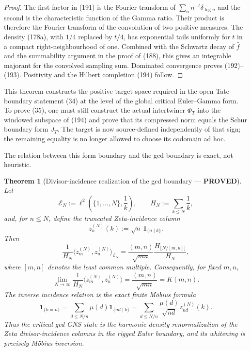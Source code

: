 \documentclass[11pt]{article}
\newtheorem{theorem}{Theorem}
\newcommand{\PROVED}{\textcolor{green!45!black}{\textbf{PROVED}}}
\begin{document}
\begin{proof}
The first factor in (191) is the Fourier transform of
$\sum_n n^{-t}\delta_{\log n}$ and the second is the characteristic function
of the Gamma ratio.  Their product is therefore the Fourier transform of the
convolution of two positive measures.  The density (178a), with $1/4$
replaced by $t/4$, has exponential tails uniformly for $t$ in a compact
right-neighbourhood of one.  Combined with the Schwartz decay of
$\widehat f$ and the summability argument in the proof of (188), this gives
an integrable majorant for the convolved sampling sum.  Dominated convergence
proves (192)--(193).  Positivity and the Hilbert completion (194) follow.
\end{proof}

This theorem constructs the positive target space required in the open
Tate-boundary statement (34) at the level of the global critical
Euler--Gamma form.  To prove (35), one must still construct the actual
intertwiner $\Phi_T$ into the windowed subspace of (194) and prove that its
compressed norm equals the Schur boundary form $J_T$.  The target is now
source-defined independently of that sign; the remaining equality is no
longer allowed to choose its codomain ad hoc.

The relation between this form boundary and the gcd boundary is exact, not
heuristic.

\begin{theorem}[Divisor-incidence realization of the gcd boundary --- \PROVED]
Let
\begin{equation}
 \mathscr E_N:=\ell^2\left(\{1,\ldots,N\},\frac1k\right),
 \qquad H_N:=\sum_{k\le N}\frac1k,
\end{equation}
and, for $n\le N$, define the truncated Zeta-incidence column
\begin{equation}
 z_n^{(N)}(k):=\sqrt n\,\mathbf1_{\{n\mid k\}}.
                                                               \tag{195}
\end{equation}
Then
\begin{equation}
 \frac1{H_N}\langle z_m^{(N)},z_n^{(N)}\rangle_{\mathscr E_N}
 =\frac{(m,n)}{\sqrt{mn}}
   \frac{H_{\lfloor N/[m,n]\rfloor}}{H_N},           \tag{196}
\end{equation}
where $[m,n]$ denotes the least common multiple.  Consequently, for fixed
$m,n$,
\begin{equation}
 \lim_{N\to\infty}\frac1{H_N}
 \langle z_m^{(N)},z_n^{(N)}\rangle
 =\frac{(m,n)}{\sqrt{mn}}=K(m,n).                    \tag{197}
\end{equation}
The inverse incidence relation is the exact finite M\"obius formula
\begin{equation}
 \mathbf1_{\{k=n\}}
 =\sum_{d\le N/n}\mu(d)\mathbf1_{\{nd\mid k\}}
 =\sum_{d\le N/n}\frac{\mu(d)}{\sqrt{nd}}
       z_{nd}^{(N)}(k).                               \tag{198}
\end{equation}
Thus the critical gcd GNS state is the harmonic-density renormalization of
the Zeta divisor-incidence columns in the rigged Euler boundary, and its
whitening is precisely M\"obius inversion.
\end{theorem}
\end{document}
